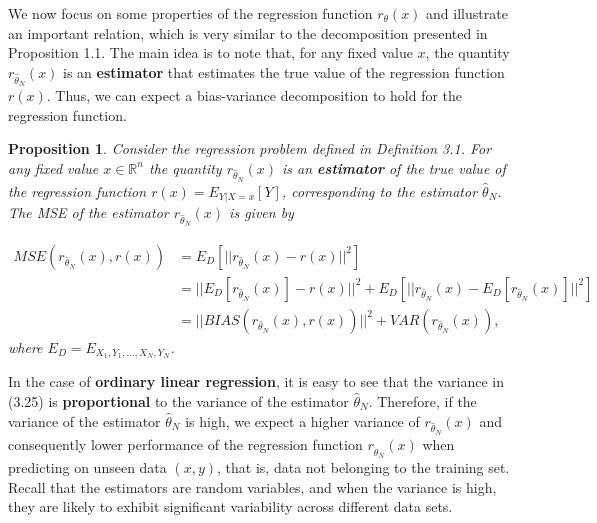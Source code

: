 \documentclass{report}
\newtheorem{proposition}{Proposition}[chapter]
\begin{document}
We now focus on some properties of the regression function $r_\theta(x)$ and illustrate an important relation, which is very similar to the decomposition presented in Proposition 1.1. The main idea is to note that, for any fixed value $x$, the quantity $r_{\hat{\theta}_N}(x)$ is an \textbf{estimator} that estimates the true value of the regression function $r(x)$. Thus, we can expect a bias-variance decomposition to hold for the regression function.

\begin{proposition}
Consider the regression problem defined in Definition 3.1. For any fixed value $x \in \mathbb{R}^n$ the quantity $r_{\hat{\theta}_N}(x)$ is an \textbf{estimator} of the true value of the regression function $r(x) = E_{Y|X = x}[Y]$, corresponding to the estimator $\hat{\theta}_N$. The MSE of the estimator $r_{\hat{\theta}_N}(x)$ is given by

\begin{equation}
\begin{split}
MSE(r_{\hat{\theta}_N}(x),r(x)) &= E_D[||r_{\hat{\theta}_N}(x) - r(x)||^2] \\
&=||E_D[r_{\hat{\theta}_N}(x)] - r(x)||^2+E_D[||r_{\hat{\theta}_N}(x) - E_D[r_{\hat{\theta}_N}(x)]||^2]\\
&=||BIAS(r_{\hat{\theta}_N}(x), r(x))||^2 + VAR(r_{\hat{\theta}_N}(x)),
\end{split}
\end{equation}
where $E_D = E_{X_1,Y_1,\dots,X_N,Y_N}$.
\end{proposition}
In the case of \textbf{ordinary linear regression}, it is easy to see that the variance in (3.25) is \textbf{proportional} to the variance of the estimator $\hat{\theta}_N$. Therefore, if the variance of the estimator $\hat{\theta}_N$ is high, we expect a higher variance of $r_{\hat{\theta}_N}(x)$ and consequently lower performance of the regression function $r_{\hat{\theta}_N}(x)$ when predicting on unseen data $(x, y)$, that is, data not belonging to the training set. Recall that the estimators are random variables, and when the variance is high, they are likely to exhibit significant variability across different data sets.
\end{document}
